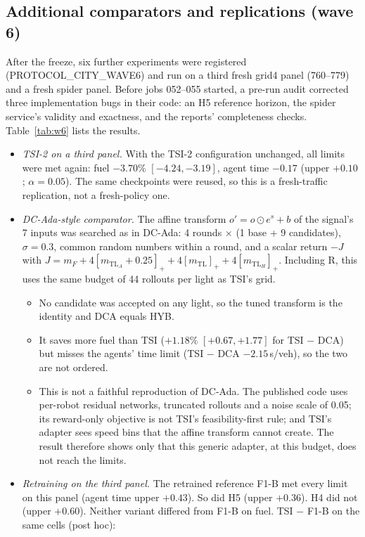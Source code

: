 \documentclass[11pt]{article}
\begin{document}
\subsection{Additional comparators and replications (wave 6)}\label{sec:w6}
After the freeze, six further experiments were registered (PROTOCOL\_CITY\_WAVE6) and run on a third fresh grid4 panel (760--779) and a
fresh spider panel. Before jobs 052--055 started, a pre-run audit corrected three implementation bugs in their code: an H5 reference
horizon, the spider service's validity and exactness, and the reports' completeness checks. Table~\ref{tab:w6} lists the results.
\begin{itemize}
\item \emph{TSI-2 on a third panel.} With the TSI-2 configuration unchanged, all limits were met again: fuel $-3.70\%$ $[-4.24,-3.19]$,
agent time $-0.17$ (upper $+0.10$; $\alpha=0.05$). The same checkpoints were reused, so this is a fresh-traffic replication, not a
fresh-policy one.
\item \emph{DC-Ada-style comparator.} The affine transform $o'=o\odot e^{s}+b$ of the signal's 7 inputs was searched as in DC-Ada:
4 rounds $\times$ (1 base + 9 candidates), $\sigma=0.3$, common random numbers within a round, and a scalar return
$-J$ with $J=m_F+4[m_{\mathrm{TL}_A}+0.25]_++4[m_{\mathrm{TL}}]_++4[m_{\mathrm{TL}_H}]_+$. Including R, this uses the same budget of 44
rollouts per light as TSI's grid.
\begin{itemize}\setlength\itemsep{0pt}
\item No candidate was accepted on any light, so the tuned transform is the identity and DCA equals HYB.
\item It saves more fuel than TSI ($+1.18\%$ $[+0.67,+1.77]$ for TSI $-$ DCA) but misses the agents' time limit (TSI $-$ DCA $-2.15$\,s/veh),
so the two are not ordered.
\item This is not a faithful reproduction of DC-Ada. The published code uses per-robot residual networks, truncated rollouts and a noise scale
of 0.05; its reward-only objective is not TSI's feasibility-first rule; and TSI's adapter sees speed bins that the affine transform cannot
create. The result therefore shows only that this generic adapter, at this budget, does not reach the limits.
\end{itemize}
\item \emph{Retraining on the third panel.} The retrained reference F1-B met every limit on this panel (agent time upper $+0.43$). So did
H5 (upper $+0.36$). H4 did not (upper $+0.60$). Neither variant differed from F1-B on fuel. TSI $-$ F1-B on the same cells (post hoc):

\end{itemize}
\end{document}
